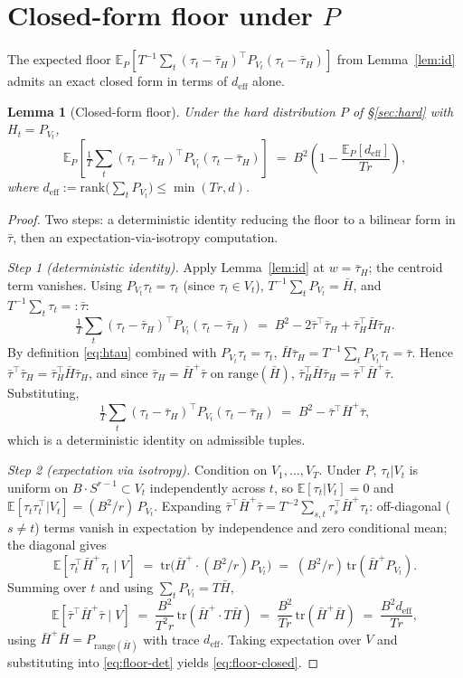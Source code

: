 \documentclass{article}
\newtheorem{lemma}[theorem]{Lemma}
\theoremstyle{remark}
\newcommand{\E}{\mathbb{E}}
\newcommand{\tr}{\mathrm{tr}}
\newcommand{\rank}{\mathrm{rank}}
\newcommand{\range}{\mathrm{range}}
\newcommand{\deff}{d_{\mathrm{eff}}}
\newcommand{\tauH}{\bar\tau_{H}}
\begin{document}
\section{Closed-form floor under $P$}\label{sec:floor}

The expected floor
$\E_P[T^{-1}\sum_t(\tau_t-\tauH)^\top P_{V_t}(\tau_t-\tauH)]$ from
Lemma~\ref{lem:id} admits an exact closed form in terms of $\deff$
alone.

\begin{lemma}[Closed-form floor]\label{lem:floor-rankr}
Under the hard distribution $P$ of \S\ref{sec:hard} with
$H_t = P_{V_t}$,
\begin{equation}\label{eq:floor-closed}
  \E_P\!\left[\tfrac{1}{T}\sum_t (\tau_t - \tauH)^\top P_{V_t}(\tau_t - \tauH)\right]
  \;=\; B^2\!\left(1 - \frac{\E_P[\deff]}{Tr}\right),
\end{equation}
where $\deff := \rank\bigl(\sum_t P_{V_t}\bigr) \leq \min(Tr, d)$.
\end{lemma}

\begin{proof}
Two steps: a deterministic identity reducing the floor to a bilinear
form in $\bar\tau$, then an expectation-via-isotropy computation.

\emph{Step 1 (deterministic identity).} Apply Lemma~\ref{lem:id} at
$w = \tauH$; the centroid term vanishes. Using $P_{V_t}\tau_t = \tau_t$
(since $\tau_t\in V_t$), $T^{-1}\sum_t P_{V_t} = \bar H$, and
$T^{-1}\sum_t\tau_t =: \bar\tau$:
\[
  \tfrac1T\sum_t(\tau_t - \tauH)^\top P_{V_t}(\tau_t-\tauH)
  \;=\; B^2 - 2\bar\tau^\top\tauH + \tauH^\top\bar H\tauH.
\]
By definition \eqref{eq:htau} combined with $P_{V_t}\tau_t = \tau_t$,
$\bar H\tauH = T^{-1}\sum_t P_{V_t}\tau_t = \bar\tau$. Hence
$\bar\tau^\top\tauH = \tauH^\top\bar H\tauH$, and since $\tauH = \bar H^+
\bar\tau$ on $\range(\bar H)$, $\tauH^\top\bar H\tauH = \bar\tau^\top
\bar H^+\bar\tau$. Substituting,
\begin{equation}\label{eq:floor-det}
  \tfrac1T\sum_t(\tau_t-\tauH)^\top P_{V_t}(\tau_t-\tauH)
  \;=\; B^2 - \bar\tau^\top\bar H^+\bar\tau,
\end{equation}
which is a deterministic identity on admissible tuples.

\emph{Step 2 (expectation via isotropy).} Condition on $V_1,\dots,V_T$.
Under $P$, $\tau_t | V_t$ is uniform on $B\cdot S^{r-1}\subset V_t$
independently across $t$, so $\E[\tau_t | V_t] = 0$ and
$\E[\tau_t\tau_t^\top | V_t] = (B^2/r)\,P_{V_t}$. Expanding
$\bar\tau^\top\bar H^+\bar\tau = T^{-2}\sum_{s,t}\tau_s^\top
\bar H^+\tau_t$: off-diagonal ($s\neq t$) terms vanish in expectation
by independence and zero conditional mean; the diagonal gives
\[
  \E[\tau_t^\top\bar H^+\tau_t \mid V]
  \;=\; \tr\!\bigl(\bar H^+\cdot(B^2/r)P_{V_t}\bigr)
  \;=\; (B^2/r)\,\tr(\bar H^+ P_{V_t}).
\]
Summing over $t$ and using $\sum_t P_{V_t} = T\bar H$,
\[
  \E[\bar\tau^\top\bar H^+\bar\tau \mid V]
  \;=\; \frac{B^2}{T^2 r}\,\tr(\bar H^+\cdot T\bar H)
  \;=\; \frac{B^2}{Tr}\,\tr(\bar H^+\bar H)
  \;=\; \frac{B^2\deff}{Tr},
\]
using $\bar H^+\bar H = P_{\range(\bar H)}$ with trace $\deff$. Taking
expectation over $V$ and substituting into \eqref{eq:floor-det}
yields \eqref{eq:floor-closed}.
\end{proof}
\end{document}
